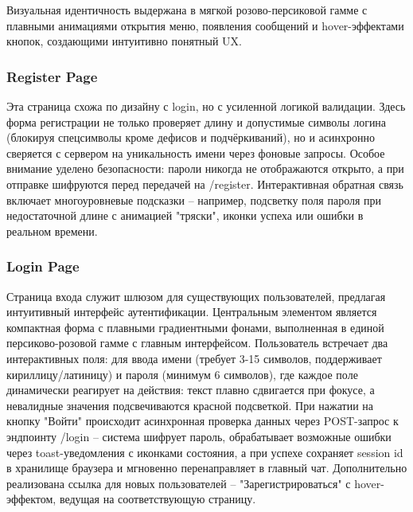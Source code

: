 Визуальная идентичность выдержана в мягкой розово-персиковой гамме с плавными анимациями открытия меню, появления сообщений и hover-эффектами кнопок, создающими интуитивно понятный UX.
\subsubsection{Register Page}
Эта страница схожа по дизайну с login, но с усиленной логикой валидации. Здесь форма регистрации не только проверяет длину и допустимые символы логина (блокируя спецсимволы кроме дефисов и подчёркиваний), но и асинхронно сверяется с сервером на уникальность имени через фоновые запросы. Особое внимание уделено безопасности: пароли никогда не отображаются открыто, а при отправке шифруются перед передачей на /register. Интерактивная обратная связь включает многоуровневые подсказки – например, подсветку поля пароля при недостаточной длине с анимацией "тряски", иконки успеха или ошибки в реальном времени. 
\subsubsection{Login Page}
Страница входа служит шлюзом для существующих пользователей, предлагая интуитивный интерфейс аутентификации. Центральным элементом является компактная форма с плавными градиентными фонами, выполненная в единой персиково-розовой гамме с главным интерфейсом. Пользователь встречает два интерактивных поля: для ввода имени (требует 3-15 символов, поддерживает кириллицу/латиницу) и пароля (минимум 6 символов), где каждое поле динамически реагирует на действия: текст плавно сдвигается при фокусе, а невалидные значения подсвечиваются красной подсветкой. При нажатии на кнопку "Войти" происходит асинхронная проверка данных через POST-запрос к эндпоинту /login – система шифрует пароль, обрабатывает возможные ошибки  через toast-уведомления с иконками состояния, а при успехе сохраняет session id в хранилище браузера и мгновенно перенаправляет в главный чат. Дополнительно реализована ссылка для новых пользователей – "Зарегистрироваться" с hover-эффектом, ведущая на соответствующую страницу.
